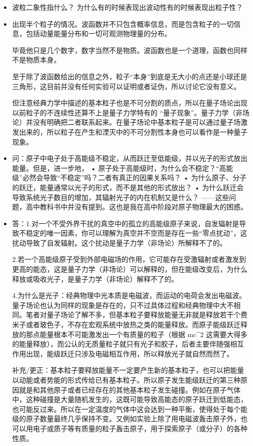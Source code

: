 \begin{itemize}
\item 波粒二象性指什么？ 为什么有的时候表现出波动性有的时候表现出粒子性？

\item 出现半个粒子的情况。波函数并不只包含概率信息，而是包含粒子的一切信息，包括动量能量分布和一切可观测物理量的分布。

毕竟他只是几个数字，数字当然不是物质。波函数也是一个道理，函数也同样不是物质本身。

至于除了波函数给出的信息之外，粒子“本身”到底是无大小的点还是小球还是三角形，这目前并没有任何实验可以证明或者证伪，所以讨论它没有意义。

但注意经典力学中描述的基本粒子也是不可分割的质点，所以在量子场论出现以前粒子的不连续性还算不上是量子力学特有的 “量子现象”。量子力学（非场论）并没有明确把二者联系起来。在量子场论中基本粒子是可以通过量子场激发出来的，所以粒子在产生和湮灭中的不可分割性本身也可以看作是一种量子现象。

\item 问：原子中电子处于高能级不稳定，从而跃迁至低能级，并以光子的形式放出能量。但是，进一步地，
• 原子处于高能级时，为什么会不稳定？“高能级”必然会导致“不稳定”吗？二者有真正的因果关系吗？
• 为什么原子、分子的跃迁，能量通常以光子的形式，而不是其他的形式放出？
• 为什么跃迁会导致系统光子数目的增加，其辐射光子的内在机制又是什么？
——这些问题，高中教科书中并没有提到。这也是我在高中阶段对原子物理最大的困惑。
\item 答：1.对一个不受外界干扰的真空中的孤立的高能级原子来说，自发辐射是导致不稳定的唯一因素，你可以理解为真空并不空而是存在一些“零点扰动”，这扰动导致了自发辐射。这个扰动是量子力学（非场论）所解释不了的。

2.若一个高能级原子受到外部电磁场的作用，它可能存在受激辐射或者激发到更高的能态，这是量子力学（非场论）可以解释的，但在能级改变后，为什么释放或吸收光子，是量子力学（非场论）解释不了的。

4.为什么是光子：经典物理中光本质是电磁波，而运动的电荷会发出电磁波。量子场论也认为同样的现象是存在的，只不过具体过程和经典物理中大不相同。笔者对量子场论了解不多，但基本粒子要释放能量无非就是释放若干个费米子或者玻色子，不存在宏观系统中放热之类的能量释放。而原子能级跃迁释放的那点能量根本不可能激发出一个有质量的粒子（根据 mc^2 这需要大得多的能量释放），而公认的无质量粒子就只有光子和胶子，后者主要伴随强相互作用出现，能级跃迁只涉及电磁相互作用，所以释放光子就自然而然了。

补充/更正：基本粒子要释放能量不一定要产生新的基本粒子，也可以把能量以动能或者势能的形式传给已有基本粒子。所以原子发生能级跃迁的第三种原因就是和其他原子或者已经存在的其他基本粒子发生碰撞。例如在原子气体中，这种碰撞是大量随机发生的，这既可能导致高能态的原子跃迁到低能态，也可能反过来。所以在一定温度的气体中这会达到一种平衡，使得处于每个能级的原子数量最终几乎保持不变。又例如实验上除了用电磁波轰击原子外，也可以用电子或质子等有质量的粒子轰击原子，用于探索原子（或分子）的各种性质。


\end{itemize}
